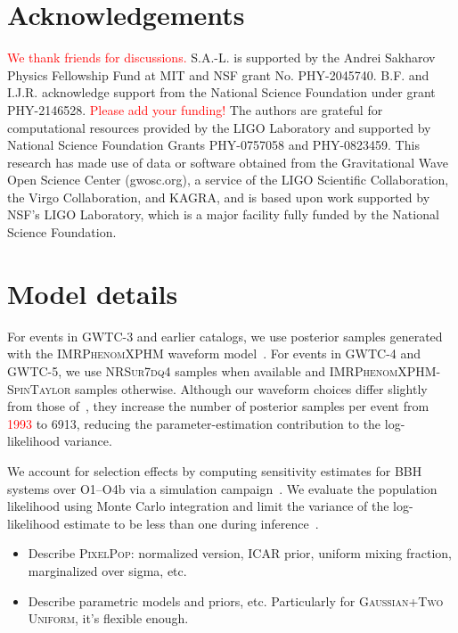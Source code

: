 \documentclass[twocolumn,twocolappendix,linenumbers]{aastex631}
\newcommand{\PixelPop}{\textsc{PixelPop}\xspace}
\newcommand{\gtwou}{\textsc{Gaussian+Two Uniform}\xspace}
\begin{document}
\section*{Acknowledgements}
\begin{acknowledgments}
\textcolor{red}{We thank friends for discussions.}
%
S.A.-L. is supported by the Andrei Sakharov Physics Fellowship Fund at MIT and NSF grant No. PHY-2045740. 
%
B.F. and I.J.R. acknowledge support from the National Science Foundation under grant PHY-2146528.
\textcolor{red}{Please add your funding!}
%
The authors are grateful for computational resources provided by the LIGO Laboratory and supported by National Science Foundation Grants PHY-0757058 and PHY-0823459.
%
This research has made use of data or software obtained from the Gravitational Wave Open Science Center (gwosc.org), a service of the LIGO Scientific Collaboration, the Virgo Collaboration, and KAGRA,
%
and is based upon work supported by NSF's LIGO Laboratory, which is a major facility fully funded by the National Science Foundation.
\end{acknowledgments}

\appendix 


\section{Model details}\label{app:model-details}

For events in \acs{GWTC-3} and earlier catalogs, we use posterior samples generated with the \textsc{IMRPhenomXPHM} waveform model~\citep{Pratten:2020ceb}.
For events in \acs{GWTC-4} and \acs{GWTC-5}, we use \textsc{NRSur7dq4} samples when available and \textsc{IMRPhenomXPHM-SpinTaylor} samples otherwise.
Although our waveform choices differ slightly from those of~\citet{LIGOScientific:2026wfs}, they increase the number of posterior samples per event from \textcolor{red}{1993} to 6913, reducing the parameter-estimation contribution to the log-likelihood variance.

We account for selection effects by computing sensitivity estimates for \acs{BBH} systems over O1--O4b via a simulation campaign~\citep{Essick:2025zed,ligo_scientific_collaboration_2026_19500052}.
We evaluate the population likelihood using Monte Carlo integration and limit the variance of the log-likelihood estimate to be less than one during inference~\citep{Tiwari:2017ndi,Essick:2022ojx,Talbot:2023pex,Heinzel:2025ogf}.

\begin{itemize}
    \item Describe \PixelPop: normalized version, ICAR prior, uniform mixing fraction, marginalized over sigma, etc.
    \item Describe parametric models and priors, etc. Particularly for \gtwou, it's flexible enough.
\end{itemize}
\end{document}
